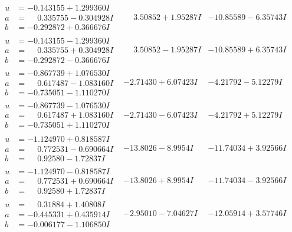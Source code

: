 \documentclass[1p]{elsarticle_modified}
\theoremstyle{definition}
\begin{document}
$$\begin{array}{c|c|c}
\begin{aligned}
u &= -0.143155 + 1.299360 I \\
a &= \phantom{-}0.335755 - 0.304928 I \\
b &= -0.292872 + 0.366676 I\end{aligned}
 & \phantom{-}3.50852 + 1.95287 I & -10.85589 - 6.35743 I \\ \hline\begin{aligned}
u &= -0.143155 - 1.299360 I \\
a &= \phantom{-}0.335755 + 0.304928 I \\
b &= -0.292872 - 0.366676 I\end{aligned}
 & \phantom{-}3.50852 - 1.95287 I & -10.85589 + 6.35743 I \\ \hline\begin{aligned}
u &= -0.867739 + 1.076530 I \\
a &= \phantom{-}0.617487 - 1.083160 I \\
b &= -0.735051 - 1.110270 I\end{aligned}
 & -2.71430 + 6.07423 I & -4.21792 - 5.12279 I \\ \hline\begin{aligned}
u &= -0.867739 - 1.076530 I \\
a &= \phantom{-}0.617487 + 1.083160 I \\
b &= -0.735051 + 1.110270 I\end{aligned}
 & -2.71430 - 6.07423 I & -4.21792 + 5.12279 I \\ \hline\begin{aligned}
u &= -1.124970 + 0.818587 I \\
a &= \phantom{-}0.772531 - 0.690664 I \\
b &= \phantom{-}0.92580 - 1.72837 I\end{aligned}
 & -13.8026 - 8.9954 I & -11.74034 + 3.92566 I \\ \hline\begin{aligned}
u &= -1.124970 - 0.818587 I \\
a &= \phantom{-}0.772531 + 0.690664 I \\
b &= \phantom{-}0.92580 + 1.72837 I\end{aligned}
 & -13.8026 + 8.9954 I & -11.74034 - 3.92566 I \\ \hline\begin{aligned}
u &= \phantom{-}0.31884 + 1.40808 I \\
a &= -0.445331 + 0.435914 I \\
b &= -0.006177 - 1.106850 I\end{aligned}
 & -2.95010 - 7.04627 I & -12.05914 + 3.57746 I \\ \hline\begin{aligned}

\end{aligned}
\end{array}$$
\end{document}
